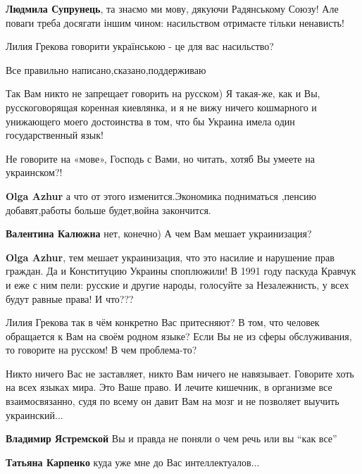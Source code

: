 \begin{itemize}
{\begin{itemize}
\textbf{Людмила Супрунець}, та знаємо ми мову, дякуючи Радянському Союзу! Але поваги треба досягати іншим чином: насильством отримаєте тільки ненависть!

Лилия Грекова говорити українською - це для вас насильство?
\end{itemize}

Все правильно написано,сказано,поддерживаю


Так Вам никто не запрещает говорить на русском) Я такая-же, как и Вы,
русскоговорящая коренная киевлянка, и я не вижу ничего кошмарного и унижающего
моего достоинства в том, что бы Украина имела один государственный язык!

Не говорите на «мове», Господь с Вами, но читать, хотяб Вы умеете на украинском?!

\textbf{Olga Azhur} а что от этого изменится.Экономика подниматься ,пенсию добавят,работы больше будет,война закончится.

\textbf{Валентина Калюжна} нет, конечно) А чем Вам мешает украинизация?

\textbf{Olga Azhur}, тем мешает украинизация, что это насилие и нарушение прав
граждан. Да и Конституцию Украины споплюжили! В 1991 году паскуда Кравчук и еже
с ним пели: русские и другие народы, голосуйте за Незалежнисть, у всех будут
равные права! И что???


Лилия Грекова так в чём конкретно Вас притесняют? В том, что человек обращается
к Вам на своём родном языке? Если Вы не из сферы обслуживания, то говорите на
русском! В чем проблема-то?


Никто ничего Вас не заставляет, никто Вам ничего не навязывает. Говорите хоть
на всех языках мира. Это Ваше право. И лечите кишечник, в организме все
взаимосвязанно, судя по всему он давит Вам на мозг и не позволяет выучить
украинский...

\begin{itemize}
\textbf{Владимир Ястремской} Вы и правда не поняли о чем речь или вы \enquote{как все}

\textbf{Татьяна Карпенко} куда уже мне до Вас интеллектуалов...


\end{itemize}}
\end{itemize}
